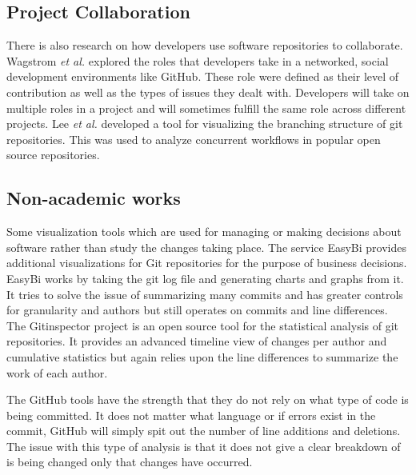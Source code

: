 \subsection{Project Collaboration}

There is also research on how developers use software repositories to collaborate. Wagstrom \textit{et al.} \cite{Patrick:Wagstrom:2012} explored the roles that developers take in a networked, social development environments like GitHub. These role were defined as their level of contribution as well as the types of issues they dealt with. Developers will take on multiple roles in a project and will sometimes fulfill the same role across different projects. Lee \textit{et al.} \cite{lee2013} developed a tool for visualizing the branching structure of git repositories. This was used to analyze concurrent workflows in popular open source repositories.

\subsection{Non-academic works}

Some visualization tools which are used for managing or making decisions about software rather than study the changes taking place. The service EasyBi \cite{EasyBi} provides additional visualizations for Git repositories for the purpose of business decisions. EasyBi works by taking the git log file and generating charts and graphs from it. It tries to solve the issue of summarizing many commits and has greater controls for granularity and authors but still operates on commits and line differences. The Gitinspector project \cite{Gitinspector} is an open source tool for the statistical analysis of git repositories. It provides an advanced timeline view of changes per author and cumulative statistics but again relies upon the line differences to summarize the work of each author.

The GitHub tools have the strength that they do not rely on what type of code is being committed. It does not matter what language or if errors exist in the commit, GitHub will simply spit out the number of line additions and deletions. The issue with this type of analysis is that it does not give a clear breakdown of is being changed only that changes have occurred.


